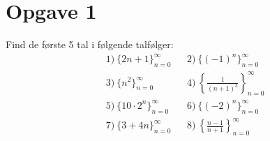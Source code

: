 
\section*{Opgave 1}
Find de første 5 tal i følgende talfølger:
\begin{align*}
&1) \  \{2n+1\}_{n=0}^\infty  &&2) \  \{(-1)^n\}_{n=0}^{\infty}   \\
&3) \  \{n^2\}_{n=0}^\infty  &&4) \  \left\{\frac{1}{(n+1)^3}\right\}_{n=0}^\infty  \\
&5) \  \{10\cdot2^n\}_{n=0}^\infty  &&6) \  \{ (-2)^n\}_{n=0}^\infty   \\
&7) \  \{3+4n\}_{n=0}^\infty  &&8) \  \left\{\frac{n-1}{n+1}\right\}_{n=0}^\infty   
\end{align*}

